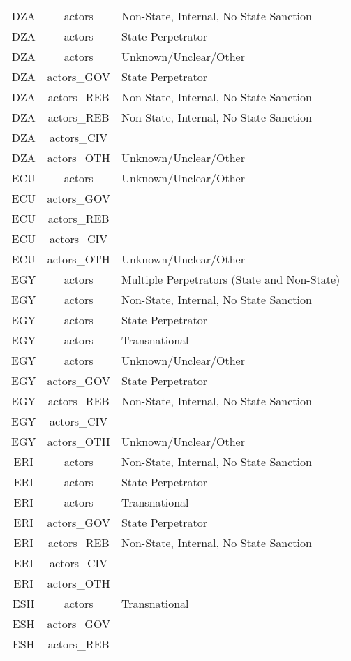 \documentclass[12pt]{article}
\begin{document}
\begin{center}
\begin{longtable}{|c|c|p{10cm}|}
  DZA & actors & Non-State, Internal, No State Sanction \\ 
  DZA & actors & State Perpetrator \\ 
  DZA & actors & Unknown/Unclear/Other \\ 
  DZA & actors\_GOV & State Perpetrator \\ 
  DZA & actors\_REB & Non-State, Internal, No State Sanction \\ 
  DZA & actors\_REB & Non-State, Internal, No State Sanction \\ 
  DZA & actors\_CIV &  \\ 
  DZA & actors\_OTH & Unknown/Unclear/Other \\ 
  ECU & actors & Unknown/Unclear/Other \\ 
  ECU & actors\_GOV &  \\ 
  ECU & actors\_REB &  \\ 
  ECU & actors\_CIV &  \\ 
  ECU & actors\_OTH & Unknown/Unclear/Other \\ 
  EGY & actors & Multiple Perpetrators (State and Non-State) \\ 
  EGY & actors & Non-State, Internal, No State Sanction \\ 
  EGY & actors & State Perpetrator \\ 
  EGY & actors & Transnational \\ 
  EGY & actors & Unknown/Unclear/Other \\ 
  EGY & actors\_GOV & State Perpetrator \\ 
  EGY & actors\_REB & Non-State, Internal, No State Sanction \\ 
  EGY & actors\_CIV &  \\ 
  EGY & actors\_OTH & Unknown/Unclear/Other \\ 
  ERI & actors & Non-State, Internal, No State Sanction \\ 
  ERI & actors & State Perpetrator \\ 
  ERI & actors & Transnational \\ 
  ERI & actors\_GOV & State Perpetrator \\ 
  ERI & actors\_REB & Non-State, Internal, No State Sanction \\ 
  ERI & actors\_CIV &  \\ 
  ERI & actors\_OTH &  \\ 
  ESH & actors & Transnational \\ 
  ESH & actors\_GOV &  \\ 
  ESH & actors\_REB &  \\ 

\end{longtable}
\end{center}
\end{document}
